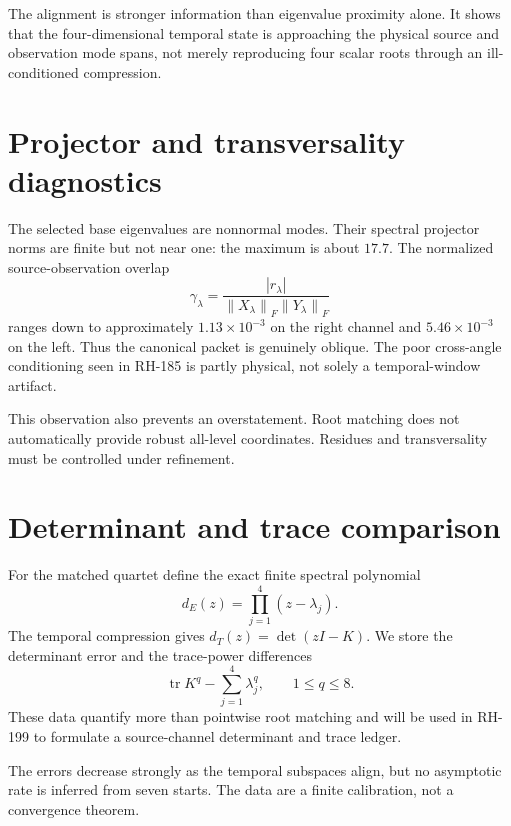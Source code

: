\documentclass[12pt]{article}
\theoremstyle{remark}
\newcommand{\norm}[1]{\left\lVert#1\right\rVert}
\begin{document}
The alignment is stronger information than eigenvalue proximity alone.  It
shows that the four-dimensional temporal state is approaching the physical
source and observation mode spans, not merely reproducing four scalar roots
through an ill-conditioned compression.

\section{Projector and transversality diagnostics}

The selected base eigenvalues are nonnormal modes.  Their spectral projector
norms are finite but not near one: the maximum is about $17.7$.  The
normalized source-observation overlap
\begin{equation}\label{eq:normalized-overlap}
 \gamma_\lambda=
 \frac{|r_\lambda|}{\norm{X_\lambda}_F\norm{Y_\lambda}_F}
\end{equation}
ranges down to approximately $1.13\times10^{-3}$ on the right channel and
$5.46\times10^{-3}$ on the left.  Thus the canonical packet is genuinely
oblique.  The poor cross-angle conditioning seen in RH-185 is partly
physical, not solely a temporal-window artifact.

This observation also prevents an overstatement.  Root matching does not
automatically provide robust all-level coordinates.  Residues and
transversality must be controlled under refinement.

\section{Determinant and trace comparison}

For the matched quartet define the exact finite spectral polynomial
\begin{equation}\label{eq:physical-determinant}
 d_E(z)=\prod_{j=1}^4(z-\lambda_j).
\end{equation}
The temporal compression gives $d_T(z)=\det(zI-K)$.  We store the determinant
error and the trace-power differences
\begin{equation}\label{eq:trace-errors}
 \operatorname{tr}K^q-\sum_{j=1}^4\lambda_j^q,
 \qquad 1\le q\le8.
\end{equation}
These data quantify more than pointwise root matching and will be used in
RH-199 to formulate a source-channel determinant and trace ledger.

The errors decrease strongly as the temporal subspaces align, but no
asymptotic rate is inferred from seven starts.  The data are a finite
calibration, not a convergence theorem.
\end{document}
